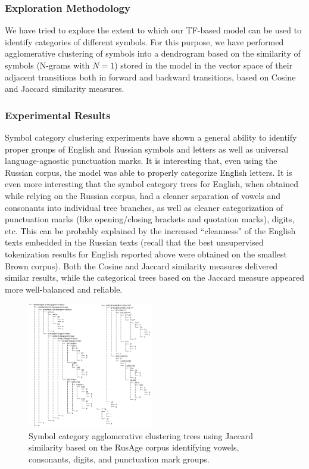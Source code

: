 \documentclass[11pt]{article}
\begin{document}
\subsubsection{Exploration Methodology}

We have tried to explore the extent to which our TF-based model can be used to identify categories of different symbols. For this purpose, we have performed agglomerative clustering of symbols into a dendrogram based on the similarity of symbols (N-grams with $N=1$) stored in the model in the vector space of their adjacent transitions both in forward and backward transitions, based on Cosine and Jaccard similarity measures.

\subsubsection{Experimental Results}

Symbol category clustering experiments have shown a general ability to identify proper groups of English and Russian symbols and letters as well as universal language-agnostic punctuation marks. It is interesting that, even using the Russian corpus, the model was able to properly categorize English letters. It is even more interesting that the symbol category trees for English, when obtained while relying on the Russian corpus, had a cleaner separation of vowels and consonants into individual tree branches, as well as cleaner categorization of punctuation marks (like opening/closing brackets and quotation marks), digits, etc. This can be probably explained by the increased “cleanness” of the English texts embedded in the Russian texts (recall that the best unsupervised tokenization results for English reported above were obtained on the smallest Brown corpus). Both the Cosine and Jaccard similarity measures delivered  similar results, while the categorical trees based on the Jaccard measure appeared more well-balanced and reliable.

\begin{figure}
  \includegraphics[width=0.49\textwidth]{imgs/figure9.png}
  \caption{Symbol category agglomerative clustering trees using Jaccard similarity based on the RusAge corpus identifying vowels, consonants, digits, and punctuation mark groups.}
\end{figure}
\end{document}

